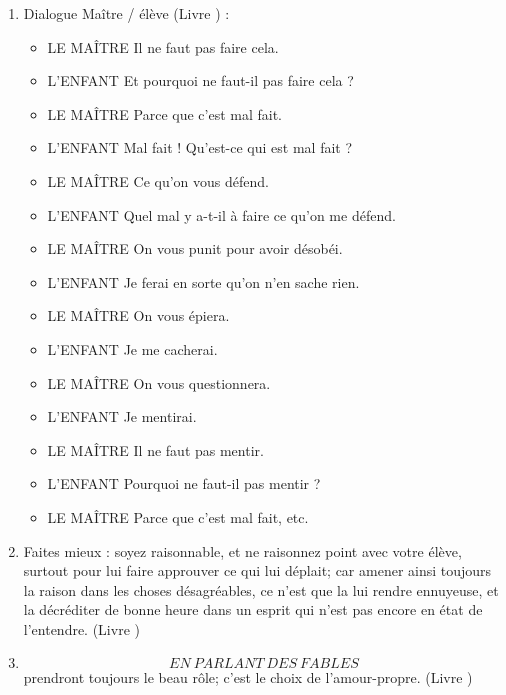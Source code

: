 \documentclass[a4paper, 11pt, hidelinks]{article}
\newcommand{\rb}[1]{\Romanbar{#1}}
\begin{document}
\begin{enumerate}
    \item Dialogue Maître / élève (Livre \rb{2}) : \begin{itemize}
                                    \item LE MAÎTRE Il ne faut pas faire cela.
                                    \item L'ENFANT Et pourquoi ne faut-il pas faire cela ?
                                    \item LE MAÎTRE Parce que c'est mal fait.
                                    \item L'ENFANT Mal fait ! Qu'est-ce qui est mal fait ?
                                    \item LE MAÎTRE Ce qu'on vous défend.
                                    \item L'ENFANT Quel mal y a-t-il à faire ce qu'on me défend.
                                    \item LE MAÎTRE On vous punit pour avoir désobéi.
                                    \item L'ENFANT Je ferai en sorte qu'on n'en sache rien.
                                    \item LE MAÎTRE On vous épiera.
                                    \item L'ENFANT Je me cacherai.
                                    \item LE MAÎTRE On vous questionnera.
                                    \item L'ENFANT Je mentirai.
                                    \item LE MAÎTRE Il ne faut pas mentir.
                                    \item L'ENFANT Pourquoi ne faut-il pas mentir ?
                                    \item LE MAÎTRE Parce que c'est mal fait, etc.
                                \end{itemize}
    \item Faites mieux : soyez raisonnable, et ne raisonnez point avec votre élève, surtout pour lui faire approuver ce qui lui déplait; car amener ainsi toujours la raison dans les choses désagréables, ce n'est que la lui rendre ennuyeuse, et la décréditer de bonne heure dans un esprit qui n'est pas encore en état de l'entendre. (Livre \rb{2})
    \item \[ EN \ PARLANT \ DES \ FABLES\] prendront toujours le beau rôle; c'est le choix de l'amour-propre. (Livre \rb{2})

\end{enumerate}
\end{document}
